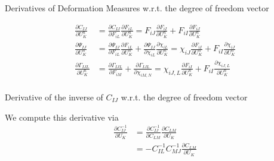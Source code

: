\documentclass[11pt]{beamer}
\begin{document}
\begin{frame}{Derivatives of Deformation Measures w.r.t. the degree of freedom vector}

\begin{align*}
\frac{\partial C_{IJ}}{\partial U_{K}^n} &= \frac{\partial C_{IJ}}{\partial F_{iL}}\frac{\partial F_{iL}}{\partial U_{K}^n} = F_{iJ}\frac{\partial F_{iI}}{\partial U_{K}^n} + F_{iI}\frac{\partial F_{iJ}}{\partial U_{K}^n}\\
\frac{\partial \Psi_{IJ}}{\partial U_{K}^n} &= \frac{\partial \Psi_{IJ}}{\partial F_{iL}}\frac{\partial F_{iL}}{\partial U_{K}^n} + \frac{\partial \Psi_{IJ}}{\partial \chi_{iL}}\frac{\partial \chi_{iL}}{\partial U_{K}^n} = \chi_{iJ} \frac{\partial F_{iI}}{\partial U_K^n} + F_{iI} \frac{\partial \chi_{iJ}}{\partial U_K^n}\\
\frac{\partial \Gamma_{IJL}}{\partial U_K^n} &= \frac{\partial \Gamma_{IJL}}{\partial F_{iM}} + \frac{\partial \Gamma_{IJL}}{\partial \chi_{iM,N}} =\chi_{iJ,L}\frac{\partial F_{iI}}{\partial U_K^n} + F_{iI}\frac{\partial \chi_{iJ,L}}{\partial U_K^n}\\
\end{align*}


\end{frame}

\begin{frame}{Derivative of the inverse of $C_{IJ}$ w.r.t. the degree of freedom vector}

We compute this derivative via
\begin{align*}
\frac{\partial C_{IJ}^{-1}}{\partial U_K} &= \frac{\partial C_{IJ}^{-1}}{\partial C_{LM}}\frac{\partial C_{LM}}{\partial U_K}\\
&= -C_{IL}^{-1} C_{MJ}^{-1}\frac{\partial C_{LM}}{\partial U_K}
\end{align*}

\end{frame}

%
%
%
\end{document}
